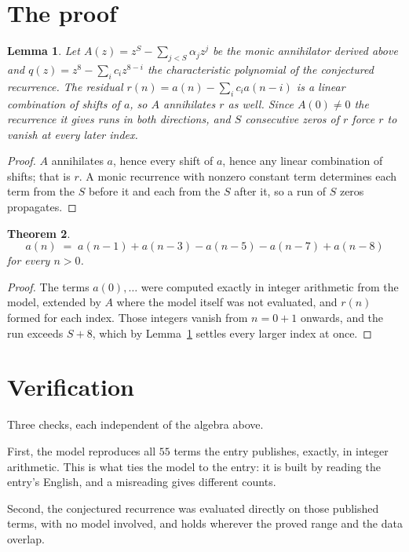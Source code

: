 \documentclass[11pt,a4paper]{article}
\theoremstyle{plain}
\newtheorem{theorem}{Theorem}
\newtheorem{lemma}[theorem]{Lemma}
\theoremstyle{definition}
\begin{document}
\section{The proof}

\begin{lemma}\label{lem:crit}
Let $A(z)=z^S-\sum_{j<S}\alpha_jz^{j}$ be the monic annihilator derived above and
$q(z)=z^{8}-\sum_ic_iz^{8-i}$ the characteristic polynomial of the conjectured
recurrence. The residual $r(n)=a(n)-\sum_ic_ia(n-i)$ is a linear combination of shifts of $a$,
so $A$ annihilates $r$ as well. Since $A(0)\ne0$ the recurrence it gives runs in both
directions, and $S$ consecutive zeros of $r$ force $r$ to vanish at every later index.
\end{lemma}

\begin{proof}
$A$ annihilates $a$, hence every shift of $a$, hence any linear combination of shifts; that is
$r$. A monic recurrence with nonzero constant term determines each term from the $S$ before it
and each from the $S$ after it, so a run of $S$ zeros propagates.
\end{proof}

\begin{theorem}
\[
a(n)\;=\;a(n-1) + a(n-3) - a(n-5) - a(n-7) + a(n-8)
\]
for every $n>0$.
\end{theorem}

\begin{proof}
The terms $a(0),\dots$ were computed exactly in integer arithmetic from the model, extended by
$A$ where the model itself was not evaluated, and $r(n)$ formed for each index. Those integers
vanish from $n=0+1$ onwards, and the run exceeds $S+8$, which by
Lemma~\ref{lem:crit} settles every larger index at once.
\end{proof}

\section{Verification}

Three checks, each independent of the algebra above.

First, the model reproduces all $55$ terms the entry publishes, exactly, in integer
arithmetic. This is what ties the model to the entry: it is built by reading the entry's
English, and a misreading gives different counts.

Second, the conjectured recurrence was evaluated directly on those published terms, with no
model involved, and holds wherever the proved range and the data overlap.
\end{document}
